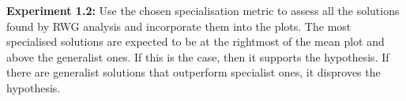 \documentclass[12pt]{article}
\begin{document}
\textbf{Experiment 1.2:} Use the chosen specialisation metric to assess all the solutions found by RWG analysis and incorporate them into the plots.
The most specialised solutions are expected to be at the rightmost of the mean plot and above the generalist ones.
If this is the case, then it supports the hypothesis.
If there are generalist solutions that outperform specialist ones, it disproves the hypothesis.\\
\end{document}
